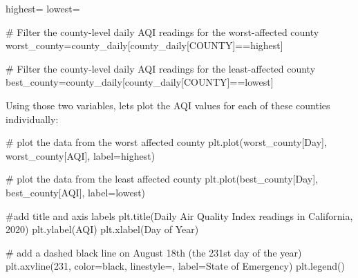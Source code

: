 \documentclass[
  letterpaper,
  DIV=11,
  numbers=noendperiod]{scrreprt}
\newenvironment{Shaded}{\begin{snugshade}}{\end{snugshade}}
\newcommand{\CommentTok}[1]{\textcolor[rgb]{0.37,0.37,0.37}{#1}}
\newcommand{\DecValTok}[1]{\textcolor[rgb]{0.68,0.00,0.00}{#1}}
\newcommand{\NormalTok}[1]{\textcolor[rgb]{0.00,0.23,0.31}{#1}}
\newcommand{\OperatorTok}[1]{\textcolor[rgb]{0.37,0.37,0.37}{#1}}
\newcommand{\StringTok}[1]{\textcolor[rgb]{0.13,0.47,0.30}{#1}}
\begin{document}
\begin{Shaded}
\begin{Highlighting}[]
\NormalTok{highest}\OperatorTok{=}\StringTok{\textquotesingle{}\textquotesingle{}}
\NormalTok{lowest}\OperatorTok{=}\StringTok{\textquotesingle{}\textquotesingle{}}

\CommentTok{\# Filter the county{-}level daily AQI readings for the worst{-}affected county}
\NormalTok{worst\_county}\OperatorTok{=}\NormalTok{county\_daily[county\_daily[}\StringTok{\textquotesingle{}COUNTY\textquotesingle{}}\NormalTok{]}\OperatorTok{==}\NormalTok{highest]}

\CommentTok{\# Filter the county{-}level daily AQI readings for the least{-}affected county}
\NormalTok{best\_county}\OperatorTok{=}\NormalTok{county\_daily[county\_daily[}\StringTok{\textquotesingle{}COUNTY\textquotesingle{}}\NormalTok{]}\OperatorTok{==}\NormalTok{lowest]}
\end{Highlighting}
\end{Shaded}

Using those two variables, lets plot the AQI values for each of these
counties individually:

\begin{Shaded}
\begin{Highlighting}[]
\CommentTok{\# plot the data from the worst affected county}
\NormalTok{plt.plot(worst\_county[}\StringTok{\textquotesingle{}Day\textquotesingle{}}\NormalTok{], worst\_county[}\StringTok{\textquotesingle{}AQI\textquotesingle{}}\NormalTok{], label}\OperatorTok{=}\NormalTok{highest)}

\CommentTok{\# plot the data from the least affected county}
\NormalTok{plt.plot(best\_county[}\StringTok{\textquotesingle{}Day\textquotesingle{}}\NormalTok{], best\_county[}\StringTok{\textquotesingle{}AQI\textquotesingle{}}\NormalTok{], label}\OperatorTok{=}\NormalTok{lowest)}

\CommentTok{\#add title and axis labels}
\NormalTok{plt.title(}\StringTok{\textquotesingle{}Daily Air Quality Index readings in California, 2020\textquotesingle{}}\NormalTok{)}
\NormalTok{plt.ylabel(}\StringTok{\textquotesingle{}AQI\textquotesingle{}}\NormalTok{)}
\NormalTok{plt.xlabel(}\StringTok{\textquotesingle{}Day of Year\textquotesingle{}}\NormalTok{)}

\CommentTok{\# add a dashed black line on August 18th (the 231st day of the year)}
\NormalTok{plt.axvline(}\DecValTok{231}\NormalTok{, color}\OperatorTok{=}\StringTok{\textquotesingle{}black\textquotesingle{}}\NormalTok{, linestyle}\OperatorTok{=}\StringTok{\textquotesingle{}{-}{-}\textquotesingle{}}\NormalTok{, label}\OperatorTok{=}\StringTok{\textquotesingle{}State of Emergency\textquotesingle{}}\NormalTok{)}
\NormalTok{plt.legend()}
\end{Highlighting}
\end{Shaded}
\end{document}
